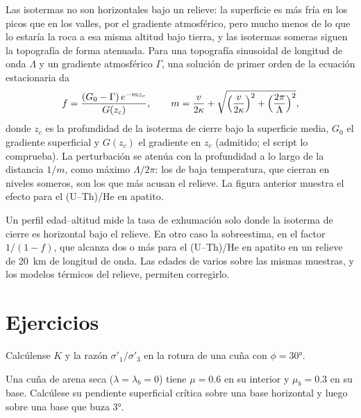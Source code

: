 Las isotermas no son horizontales bajo un relieve: la superficie es más fría en los picos
que en los valles, por el gradiente atmosférico, pero mucho menos de lo que lo estaría la roca
a esa misma altitud bajo tierra, y las isotermas someras
siguen la topografía de forma atenuada. Para una topografía sinusoidal de
longitud de onda $\Lambda$ y un gradiente atmosférico $\Gamma$, una solución de primer orden de la
ecuación estacionaria da
\[
  f = \frac{(G_0 - \Gamma)\,e^{-mz_c}}{G(z_c)},\qquad
  m = \frac{v}{2\kappa} + \sqrt{\Bigl(\frac{v}{2\kappa}\Bigr)^2 +
  \Bigl(\frac{2\pi}{\Lambda}\Bigr)^2},
\]
donde $z_c$ es la profundidad de la isoterma de cierre bajo la superficie media,
$G_0$ el gradiente superficial y $G(z_c)$ el gradiente en $z_c$ (admitido;
el script lo comprueba). La perturbación se atenúa con la profundidad a lo largo de la
distancia $1/m$, como máximo $\Lambda/2\pi$: los  de baja temperatura,
que cierran en niveles someros, son los que más acusan el relieve. La figura anterior muestra el efecto
para el (U--Th)/He en apatito.

Un perfil edad--altitud mide la tasa de exhumación solo donde la
isoterma de cierre es horizontal bajo el relieve. En otro caso la sobreestima, en el factor $1/(1 - f)$, que alcanza
dos o más para el (U--Th)/He en apatito en un relieve de \qty{20}{km} de longitud de onda.
Las edades de varios  sobre las mismas muestras, y los modelos térmicos
del relieve, permiten corregirlo.

\section{Ejercicios}

\begin{exercise}[$\star$]\label{exo:b3:orogenic-wedges:1}
Calcúlense $K$ y la razón $\sigma'_1/\sigma'_3$ en la rotura de una cuña con
$\phi = \ang{30}$.
\end{exercise}

\begin{exercise}[$\star$]\label{exo:b3:orogenic-wedges:2}
Una cuña de arena seca ($\lambda = \lambda_b = 0$) tiene $\mu = 0.6$
en su interior y $\mu_b = 0.3$ en su base. Calcúlese su pendiente superficial crítica sobre una
base horizontal y luego sobre una base que buza \ang{3}.
\end{exercise}

